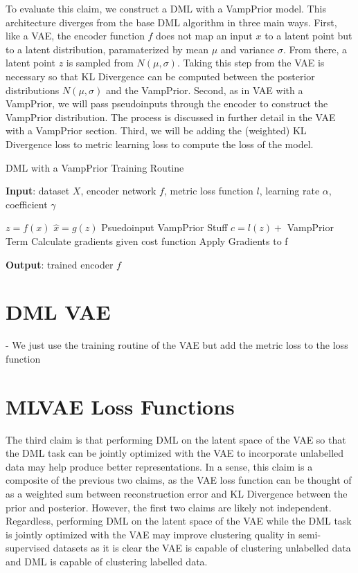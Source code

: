 \documentclass[./dissertation.tex]{subfiles}
\begin{document}
    To evaluate this claim, we construct a DML with a VampPrior model. This architecture diverges from the base DML algorithm in three main ways. First, like a VAE, the encoder function $f$ does not map an input $x$ to a latent point but to a latent distribution, paramaterized by mean $\mu$ and variance $\sigma$. From there, a latent point $z$ is sampled from $N(\mu, \sigma)$. Taking this step from the VAE is necessary so that KL Divergence can be computed between the posterior distributions $N(\mu, \sigma)$ and the VampPrior. Second, as in VAE with a VampPrior, we will pass pseudoinputs through the encoder to construct the VampPrior distribution. The process is discussed in further detail in the VAE with a VampPrior section. Third, we will be adding the (weighted) KL Divergence loss to metric learning loss to compute the loss of the model. 
  
    \begin{algorithm}
    \caption{DML with a VampPrior Training Routine}\label{alg:cap}
    \hspace*{\algorithmicindent} \textbf{Input}: dataset $X$, encoder network $f$, metric loss function $l$, learning rate $\alpha$, coefficient $\gamma$
    \begin{algorithmic}[1]
        \State $z = f(x)$
        \State $\hat{x} = g(z)$
        \State Psuedoinput VampPrior Stuff
        \State $c = l(z) + $ VampPrior Term
        \State Calculate gradients given cost function
        \State Apply Gradients to f
    \EndFor
    \end{algorithmic}
    \hspace*{\algorithmicindent} \textbf{Output}: trained encoder $f$
    \end{algorithm}  
    
    \section{DML VAE}
    - We just use the training routine of the VAE but add the metric loss to the loss function
  
    \section{MLVAE Loss Functions}
    The third claim is that performing DML on the latent space of the VAE so that the DML task can be jointly optimized with the VAE to incorporate unlabelled data may help produce better representations. In a sense, this claim is a composite of the previous two claims, as the VAE loss function can be thought of as a weighted sum between reconstruction error and KL Divergence between the prior and posterior. However, the first two claims are likely not independent. Regardless, performing DML on the latent space of the VAE while the DML task is jointly optimized with the VAE may improve clustering quality in semi-supervised datasets as it is clear the VAE is capable of clustering unlabelled data and DML is capable of clustering labelled data. \\
    
\end{document}
